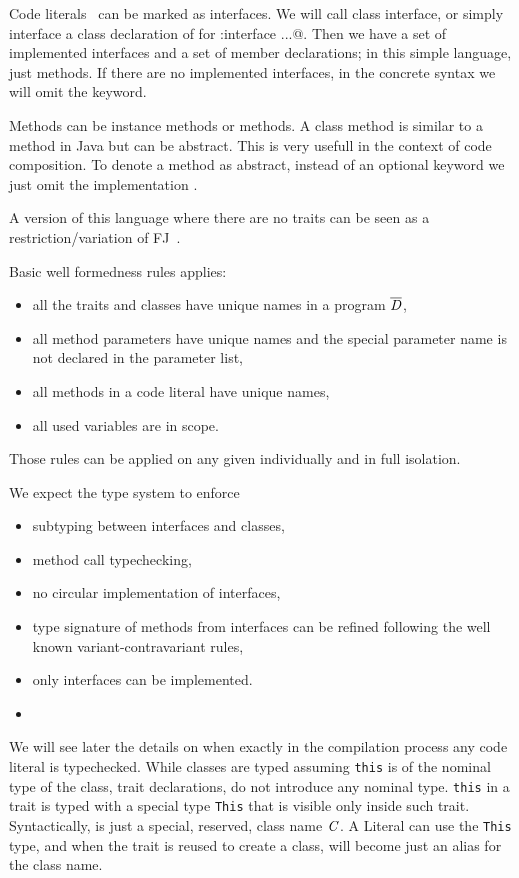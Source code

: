 Code literals \mL\ can be marked as interfaces.  We will call class
interface, or simply interface a class declaration of for \Q@C:{interface  ...}@.
  Then we have a set of implemented interfaces and a set of member declarations; in this simple language, just methods.
If there are no implemented interfaces, in the concrete syntax we will omit the \Q@implements@ keyword.

Methods \mMD can be instance methods or \Q@class@ methods. A class method is similar to a \Q@static@ method in Java but can be abstract. This is very usefull in the context of code composition.
To denote a method as abstract, instead of an optional keyword we just omit the implementation \me.

A version of this language where there are no traits can be seen 
as a restriction/variation of FJ~\cite{igarashi2001featherweight}.

Basic well formedness rules applies:
\begin{itemize}
\item all the traits and classes have unique names in a program $\overline{\mathit{D}}$,
\item all method parameters have unique names and the special parameter name \Q@this@ is not declared
 in the parameter list,
\item all methods in a code literal have unique names,
\item all used variables are in scope.
\end{itemize}
Those rules can be applied on any given \mL individually and in full isolation.

We expect the type system to enforce 
\begin{itemize}
\item subtyping between interfaces and classes,
\item method call typechecking,
\item no circular implementation of interfaces,
\item type signature of methods from interfaces can be refined following the well known variant-contravariant rules,
\item only interfaces can be implemented.
\item {}
\end{itemize}
We will see later the details on when exactly in the compilation process any code literal is typechecked.
While classes are typed assuming \lstinline{this} is of the nominal type of the
class, trait declarations, do not introduce any nominal type.  \lstinline{this}
in a trait is typed with a special type \lstinline{This} that is visible only
inside such trait. Syntactically, \Q@This@ is just a special, reserved, class name $\mathit{C}$.
A Literal can use the \lstinline{This} type,
and when the trait is reused to create a class, \Q@This@ will become just
an alias for the class name.

